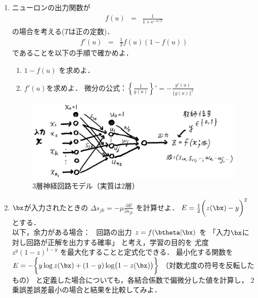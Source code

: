 \documentclass[a4paper,11pt]{jarticle}
\begin{document}
\begin{enumerate}

\item 
ニューロンの出力関数が
\begin{eqnarray}
f(u) & = & \frac{1}{1 + \text{e}^{-u/T} } 
\end{eqnarray}
の場合を考える($T$は正の定数)．
\begin{eqnarray}
f'(u) & = & \frac{1}{T} f(u) ( 1 - f(u) )
\end{eqnarray}
であることを以下の手順で確かめよ．
      

\begin{enumerate}
\item $ 1 - f(u) $ を求めよ．

\vskip 20mm
      
\item $f'(u)$を求めよ． 微分の公式：$ \left \{ \frac{1}{g(u)} \right \}' = - \frac{g'(u)}{\{g(u)\}^2 }$

\end{enumerate}



      \newpage


\begin{figure}[hbt]
\begin{center}
\includegraphics[width=.8\linewidth]{figs/nn20180425bw.eps}
\caption{3層神経回路モデル（実質は2層）\label{fig:3layer}}
\end{center}
\end{figure}


 \item $\bx$が入力されたときの $\Delta s_{jk} = - \mu \frac{\partial
       E}{\partial s_{jk}}
              $ を計算せよ．
$ E =  \frac{1}{2} 
\biggl ( z(\bx) - y \biggr )^2
$
とする．\\
以下，余力がある場合：~
回路の出力 $ z = f(\btheta | \bx)$ を
「入力$\bx$に対し回路が正解を出力する確率」
       と考え，学習の目的を
       尤度 $ z^y (1-z)^{1-y}$
を最大化することと定式化できる．
最小化する関数を
       $ E= - \biggl \{ y \log z(\bx) + (1-y) \log \bigl ( 1-z(\bx)
       \bigr )  \biggr \}$
       （対数尤度の符号を反転したもの）
       と定義した場合についても，各結合係数で偏微分した値を計算し，
       2乗誤差誤差最小の場合と結果を比較してみよ．
       


\end{enumerate}
\end{document}
